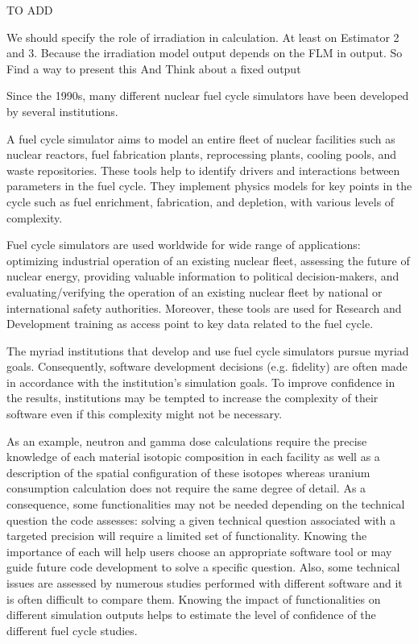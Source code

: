 TO ADD

We should specify the role of irradiation in calculation. At least on Estimator 2 and 3. Because the irradiation model output depends on the FLM in output. 
So Find a way to present this
And Think about a fixed output 



Since the 1990s, many different nuclear fuel cycle simulators have been developed by several institutions.

A fuel cycle simulator aims to model an entire fleet of nuclear facilities such as nuclear reactors, fuel fabrication plants, reprocessing plants, cooling pools, and waste repositories.
These tools help to identify drivers and interactions between parameters in the fuel cycle.
They implement physics models for key points in the cycle such as fuel enrichment, fabrication, and depletion, with various levels of complexity.

Fuel cycle simulators are used worldwide for wide range of applications: optimizing industrial operation of an existing nuclear fleet, assessing the future of nuclear energy, providing valuable information to political decision-makers, and evaluating/verifying the operation of an existing nuclear fleet by national or international safety authorities.
Moreover, these tools are used for Research and Development training as access point to key data related to the fuel cycle.

The myriad institutions that develop and use fuel cycle simulators pursue myriad goals.
Consequently, software development decisions (e.g. fidelity) are often made in accordance with the institution's simulation goals. To improve confidence in the results, institutions may be tempted to increase the complexity of their software even if this complexity might not be necessary.

As an example, neutron and gamma dose calculations require the precise knowledge of each material isotopic composition in each facility as well as a description of the spatial configuration of these isotopes whereas uranium consumption calculation does not require the same degree of detail.
As a consequence, some functionalities may not be needed depending on the technical question the code assesses: solving a given technical question associated with a targeted precision will require a limited set of functionality.
Knowing the importance of each will help users choose an appropriate software tool or may guide future code development to solve a specific question.
Also, some technical issues are assessed by numerous studies performed with different software and it is often difficult to compare them.
Knowing the impact of functionalities on different simulation outputs helps to estimate the level of confidence of the different fuel cycle studies.

